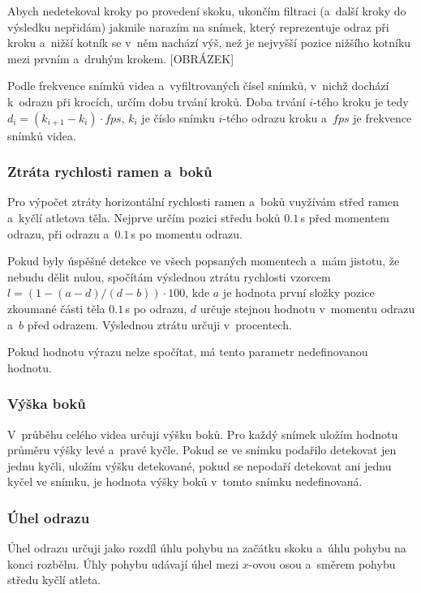 Abych nedetekoval kroky po provedení skoku, ukončím filtraci (a~další kroky do výsledku nepřidám) jakmile narazím na snímek, který reprezentuje odraz při kroku a~nižší kotník se v~něm nachází výš, než je nejvyšší pozice nižšího kotníku mezi prvním a~druhým krokem. [OBRÁZEK]

Podle frekvence snímků videa a~vyfiltrovaných čísel snímků, v~nichž dochází k~odrazu při krocích, určím dobu trvání kroků. Doba trvání $i$-tého kroku je tedy $d_i=(k_{i+1}-k_i)\cdot fps$, $k_i$ je číslo snímku $i$-tého odrazu kroku a~$fps$ je frekvence snímků videa.


\subsubsection{Ztráta rychlosti ramen a~boků}

Pro výpočet ztráty horizontální rychlosti ramen a~boků vuyžívám střed ramen a~kyčlí atletova těla. Nejprve určím pozici středu boků $0.1$\,\rm s před momentem odrazu, při odrazu a~$0.1$\,\rm s po momentu odrazu.

Pokud byly úspěšné detekce ve všech popsaných momentech a~mám jistotu, že nebudu dělit nulou, spočítám výslednou ztrátu rychlosti vzorcem $l=(1-(a-d)/(d-b))\cdot100$, kde $a$ je hodnota první složky pozice zkoumané části těla $0.1$\,\rm s po odrazu, $d$ určuje stejnou hodnotu v~momentu odrazu a~$b$ před odrazem. Výslednou ztrátu určuji v~procentech.

Pokud hodnotu výrazu nelze spočítat, má tento parametr nedefinovanou hodnotu.


\subsubsection{Výška boků}

V~průběhu celého videa určuji výšku boků. Pro každý snímek uložím hodnotu průměru výšky levé a~pravé kyčle. Pokud se ve snímku podařilo detekovat jen jednu kyčli, uložím výšku detekované, pokud se nepodaří detekovat ani jednu kyčel ve snímku, je hodnota výšky boků v~tomto snímku nedefinovaná.


\subsubsection{Úhel odrazu}

Úhel odrazu určuji jako rozdíl úhlu pohybu na začátku skoku a~úhlu pohybu na konci rozběhu. Úhly pohybu udávají úhel mezi $x$-ovou osou a~směrem pohybu středu kyčlí atleta.

